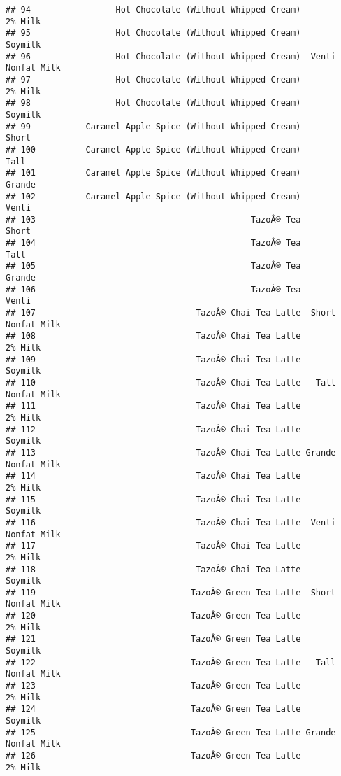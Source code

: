 \documentclass[
]{article}
\begin{document}
\begin{verbatim}
## 94                 Hot Chocolate (Without Whipped Cream)            2% Milk
## 95                 Hot Chocolate (Without Whipped Cream)            Soymilk
## 96                 Hot Chocolate (Without Whipped Cream)  Venti Nonfat Milk
## 97                 Hot Chocolate (Without Whipped Cream)            2% Milk
## 98                 Hot Chocolate (Without Whipped Cream)            Soymilk
## 99           Caramel Apple Spice (Without Whipped Cream)              Short
## 100          Caramel Apple Spice (Without Whipped Cream)               Tall
## 101          Caramel Apple Spice (Without Whipped Cream)             Grande
## 102          Caramel Apple Spice (Without Whipped Cream)              Venti
## 103                                           TazoÂ® Tea              Short
## 104                                           TazoÂ® Tea               Tall
## 105                                           TazoÂ® Tea             Grande
## 106                                           TazoÂ® Tea              Venti
## 107                                TazoÂ® Chai Tea Latte  Short Nonfat Milk
## 108                                TazoÂ® Chai Tea Latte            2% Milk
## 109                                TazoÂ® Chai Tea Latte            Soymilk
## 110                                TazoÂ® Chai Tea Latte   Tall Nonfat Milk
## 111                                TazoÂ® Chai Tea Latte            2% Milk
## 112                                TazoÂ® Chai Tea Latte            Soymilk
## 113                                TazoÂ® Chai Tea Latte Grande Nonfat Milk
## 114                                TazoÂ® Chai Tea Latte            2% Milk
## 115                                TazoÂ® Chai Tea Latte            Soymilk
## 116                                TazoÂ® Chai Tea Latte  Venti Nonfat Milk
## 117                                TazoÂ® Chai Tea Latte            2% Milk
## 118                                TazoÂ® Chai Tea Latte            Soymilk
## 119                               TazoÂ® Green Tea Latte  Short Nonfat Milk
## 120                               TazoÂ® Green Tea Latte            2% Milk
## 121                               TazoÂ® Green Tea Latte            Soymilk
## 122                               TazoÂ® Green Tea Latte   Tall Nonfat Milk
## 123                               TazoÂ® Green Tea Latte            2% Milk
## 124                               TazoÂ® Green Tea Latte            Soymilk
## 125                               TazoÂ® Green Tea Latte Grande Nonfat Milk
## 126                               TazoÂ® Green Tea Latte            2% Milk

\end{verbatim}
\end{document}
